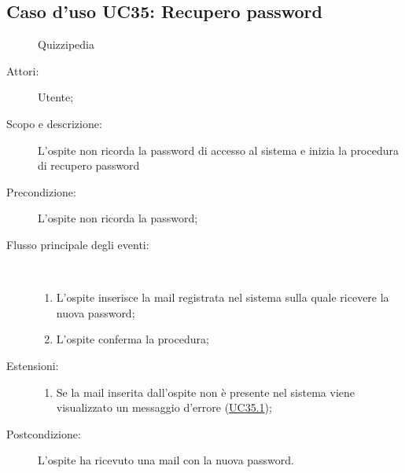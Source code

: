 \subsection{Caso d'uso UC35: Recupero password}
	\begin{figure}[H]
		\centering
		\begin{resizedtikzpicture}{\textwidth}
		\begin{umlsystem}[x=0, fill=lightgray!20]{Quizzipedia}
		\end{umlsystem}
		\end{resizedtikzpicture}
		\caption{}
	\end{figure}
\begin{description}
\item[Attori:] Utente;
\item[Scopo e descrizione:] L'ospite non ricorda la password di accesso al sistema e inizia la procedura di recupero password 
      \item[Precondizione:] L'ospite non ricorda la password;

        \item[Flusso principale degli eventi:] \ 
 \begin{enumerate}
          \item L'ospite inserisce la mail registrata nel sistema sulla quale ricevere la nuova password;
          \item L'ospite conferma la procedura;

      \end{enumerate}
    \item[Estensioni:]
      \begin{enumerate}
          \item Se la mail inserita dall'ospite non è presente nel sistema viene visualizzato un messaggio d'errore (\hyperlink{UC35.1}{UC35.1});

      \end{enumerate}
    \item[Postcondizione:] L'ospite ha ricevuto una mail con la nuova password.
  \end{description}
\hypertarget{UC35.1}{}
